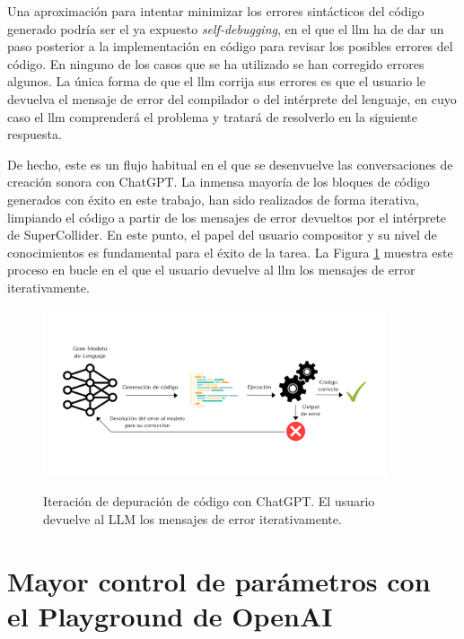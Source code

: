 Una aproximación para intentar minimizar los errores sintácticos del código generado podría ser el ya expuesto \emph{self-debugging}, en el que el \gls{llm} ha de dar un paso posterior a la implementación en código para revisar los posibles errores del código. En ninguno de los casos que se ha utilizado se han corregido errores algunos. La única forma de que el \gls{llm} corrija sus errores es que el usuario le devuelva el mensaje de error del compilador o del intérprete del lenguaje, en cuyo caso el \gls{llm} comprenderá el problema y tratará de resolverlo en la siguiente respuesta. 

De hecho, este es un flujo habitual en el que se desenvuelve las conversaciones de creación sonora con ChatGPT. La inmensa mayoría de los bloques de código generados con éxito en este trabajo, han sido realizados de forma iterativa, limpiando el código a partir de los mensajes de error devueltos por el intérprete de SuperCollider. En este punto, el papel del usuario compositor y su nivel de conocimientos es fundamental para el éxito de la tarea. La Figura \ref{fig:iteracion_depuracion} muestra este proceso en bucle en el que el usuario devuelve al \gls{llm} los mensajes de error iterativamente.

\begin{figure}[H]
    \caption[Iteración de depuración de código con ChatGPT]{Iteración de depuración de código con ChatGPT. El usuario devuelve al LLM los mensajes de error iterativamente.}
    \centering
    \includegraphics[width=0.9\textwidth]{./figuras/iteracion_depuracion_codigo.png}
    \source{\propio}
    \label{fig:iteracion_depuracion}
\end{figure}

\section{Mayor control de parámetros con el Playground de OpenAI}

